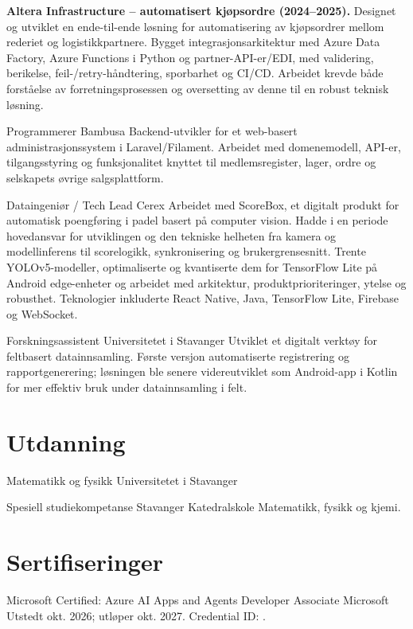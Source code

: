 \documentclass[a4paper,
		10pt]{article}
\let\oldhref\href
\renewcommand{\href}[3][blue]{\oldhref{#2}{\color{#1}{#3}}}
\newcommand{\uis}{Universitetet i Stavanger}
\begin{document}
{	\newline\vspace{.15cm}
	\textbf{Altera Infrastructure -- automatisert kjøpsordre (2024--2025).} Designet og utviklet en ende-til-ende løsning for automatisering av kjøpsordrer mellom rederiet og logistikkpartnere. Bygget integrasjonsarkitektur med Azure Data Factory, Azure Functions i Python og partner-API-er/EDI, med validering, berikelse, feil-/retry-håndtering, sporbarhet og CI/CD. Arbeidet krevde både forståelse av forretningsprosessen og oversetting av denne til en robust teknisk løsning.
	}

	{Programmerer}
	{Bambusa}
	{Backend-utvikler for et web-basert administrasjonssystem i Laravel/Filament. Arbeidet med domenemodell, API-er, tilgangsstyring og funksjonalitet knyttet til medlemsregister, lager, ordre og selskapets øvrige salgsplattform.}

	{Dataingeniør / Tech Lead}
	{Cerex}
	{Arbeidet med ScoreBox, et digitalt produkt for automatisk poengføring i padel basert på computer vision. Hadde i en periode hovedansvar for utviklingen og den tekniske helheten fra kamera og modellinferens til scorelogikk, synkronisering og brukergrensesnitt. Trente YOLOv5-modeller, optimaliserte og kvantiserte dem for TensorFlow Lite på Android edge-enheter og arbeidet med arkitektur, produktprioriteringer, ytelse og robusthet. Teknologier inkluderte React Native, Java, TensorFlow Lite, Firebase og WebSocket.}

	{Forskningsassistent}
	{\uis}
	{Utviklet et digitalt verktøy for feltbasert datainnsamling. Første versjon automatiserte registrering og rapportgenerering; løsningen ble senere videreutviklet som Android-app i Kotlin for mer effektiv bruk under datainnsamling i felt.}

\section{Utdanning}

	{Matematikk og fysikk}
	{\uis}
	{}

	{Spesiell studiekompetanse}
	{Stavanger Katedralskole}
	{Matematikk, fysikk og kjemi.}

\section{Sertifiseringer}

	{Microsoft Certified: Azure AI Apps and Agents Developer Associate}
	{Microsoft}
	{Utstedt okt. 2026; utløper okt. 2027. Credential ID: \href{https://learn.microsoft.com/en-us/users/ghalv/credentials/6baebdede0c7432c}{6BAEBDEDE0C7432C}.}
\end{document}
